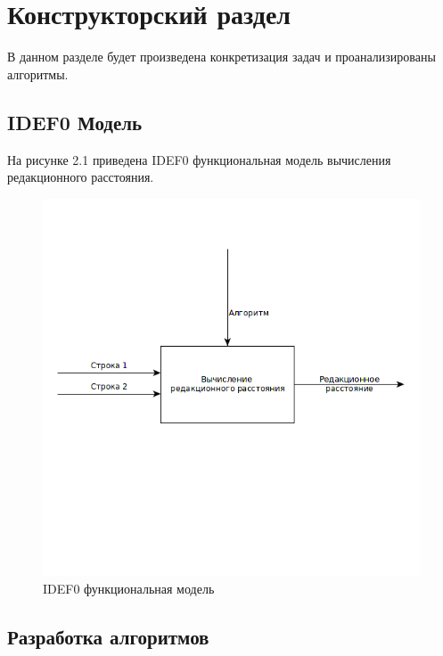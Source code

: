 \graphicspath{{pict/}}

\chapter{Конструкторский раздел}
\label{cha:design}

В данном разделе будет произведена конкретизация задач и проанализированы алгоритмы.

\section{IDEF0 Модель}

На рисунке 2.1 приведена IDEF0 функциональная модель вычисления редакционного расстояния.
\begin{figure}[H]
\centering
\includegraphics[scale=0.75]{1}
\caption{IDEF0 функциональная модель}
\end{figure}
\newpage

\section{Разработка алгоритмов}

